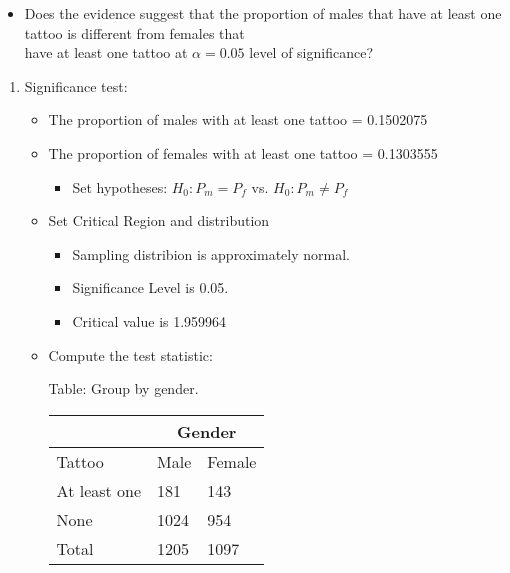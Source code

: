 \documentclass[11pt]{book}\usepackage[]{graphicx}\usepackage[]{color}
\begin{document}
\begin{exercises}
\begin{exercise}
\begin{itemize}

\item Does the evidence suggest that the proportion of males that have at least one tattoo is different from females that \\ have at least one tattoo at $\alpha = 0.05$ level of significance?

\end{itemize}

  \vspace{5mm}

\end{exercise}
\vspace{2mm}
\begin{solution}

  	  \begin{enumerate}
	 \item Significance test:


\begin{itemize}
\item The proportion of males with at least one tattoo = 0.1502075
\item The proportion of females with at least one tattoo = 0.1303555
  \begin{itemize}
  \item Set hypotheses: $H_0: P_m = P_f$ vs. $H_0: P_m \ne P_f$
  \end{itemize}

\item Set Critical Region and distribution

  \begin{itemize}
  \item Sampling distribion is approximately normal.
  \item Significance Level is 0.05.
  \item Critical value is 1.959964
  \end{itemize}

\item Compute the test statistic:

\begin{minipage}[h]{6cm}

Table: Group  by gender.

      \begin{tabular}{@{} p{2.5cm} p{1cm} p{1cm} @{}} \hline %
     &  \multicolumn{2}{c}{Gender } \\ \hline
     Tattoo   & Male & Female \\ \hline
     At least one   & 181 & 143 \\
     None          & 1024 & 954 \\ \hline
     Total        & 1205 & 1097 \\ \hline
   \end{tabular}


\end{minipage}
\end{itemize}
\end{enumerate}
\end{solution}
\end{exercises}
\end{document}
